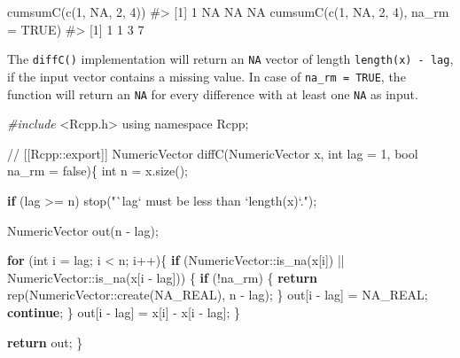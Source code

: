 \documentclass[
]{krantz}
\makeatletter
\newenvironment{Shaded}{\begin{snugshade}}{\end{snugshade}}
\newcommand{\CommentTok}[1]{\textcolor[rgb]{0.56,0.35,0.01}{\textit{#1}}}
\newcommand{\ControlFlowTok}[1]{\textcolor[rgb]{0.13,0.29,0.53}{\textbf{#1}}}
\newcommand{\DataTypeTok}[1]{\textcolor[rgb]{0.13,0.29,0.53}{#1}}
\newcommand{\DecValTok}[1]{\textcolor[rgb]{0.00,0.00,0.81}{#1}}
\newcommand{\ImportTok}[1]{#1}
\newcommand{\KeywordTok}[1]{\textcolor[rgb]{0.13,0.29,0.53}{\textbf{#1}}}
\newcommand{\NormalTok}[1]{#1}
\newcommand{\OtherTok}[1]{\textcolor[rgb]{0.56,0.35,0.01}{#1}}
\newcommand{\PreprocessorTok}[1]{\textcolor[rgb]{0.56,0.35,0.01}{\textit{#1}}}
\newcommand{\StringTok}[1]{\textcolor[rgb]{0.31,0.60,0.02}{#1}}
\newenvironment{kframe}{%
\medskip{}
\setlength{\fboxsep}{.8em}
 \def\at@end@of@kframe{}%
 \ifinner\ifhmode%
  \def\at@end@of@kframe{\end{minipage}}%
  \begin{minipage}{\columnwidth}%
 \fi\fi%
 \def\FrameCommand##1{\hskip\@totalleftmargin \hskip-\fboxsep
 \colorbox{shadecolor}{##1}\hskip-\fboxsep
     \hskip-\linewidth \hskip-\@totalleftmargin \hskip\columnwidth}%
 \MakeFramed {\advance\hsize-\width
   \@totalleftmargin\z@ \linewidth\hsize
   \@setminipage}}%
 {\par\unskip\endMakeFramed%
 \at@end@of@kframe}
\renewenvironment{Shaded}{\begin{kframe}}{\end{kframe}}
\renewcommand{\KeywordTok} [1]{\textcolor[rgb]{0.00,0.44,0.13}{{#1}}}
\renewcommand{\DataTypeTok}[1]{\textcolor[rgb]{0.56,0.13,0.00}{{#1}}}
\renewcommand{\DecValTok}  [1]{\textcolor[rgb]{0.25,0.63,0.44}{{#1}}}
\renewcommand{\StringTok}  [1]{\textcolor[rgb]{0.25,0.44,0.63}{{#1}}}
\renewcommand{\CommentTok} [1]{\textcolor[rgb]{0.38,0.63,0.69}{{#1}}}
\renewcommand{\OtherTok}   [1]{\textcolor[rgb]{0.00,0.44,0.13}{{#1}}}
\renewcommand{\NormalTok}  [1]{{#1}}
\makeatother
\begin{document}
\begin{Shaded}
\begin{Highlighting}[]
\KeywordTok{cumsumC}\NormalTok{(}\KeywordTok{c}\NormalTok{(}\DecValTok{1}\NormalTok{, }\OtherTok{NA}\NormalTok{, }\DecValTok{2}\NormalTok{, }\DecValTok{4}\NormalTok{))}
\CommentTok{#> [1]  1 NA NA NA}
\KeywordTok{cumsumC}\NormalTok{(}\KeywordTok{c}\NormalTok{(}\DecValTok{1}\NormalTok{, }\OtherTok{NA}\NormalTok{, }\DecValTok{2}\NormalTok{, }\DecValTok{4}\NormalTok{), }\DataTypeTok{na_rm =} \OtherTok{TRUE}\NormalTok{)}
\CommentTok{#> [1] 1 1 3 7}
\end{Highlighting}
\end{Shaded}

The \texttt{diffC()} implementation will return an \texttt{NA} vector of length \texttt{length(x)\ -\ lag}, if the input vector contains a missing value. In case of \texttt{na\_rm\ =\ TRUE}, the function will return an \texttt{NA} for every difference with at least one \texttt{NA} as input.

\begin{Shaded}
\begin{Highlighting}[]
\PreprocessorTok{#include }\ImportTok{<Rcpp.h>}
\KeywordTok{using} \KeywordTok{namespace}\NormalTok{ Rcpp;}

\CommentTok{// [[Rcpp::export]]}
\NormalTok{NumericVector diffC(NumericVector x, }\DataTypeTok{int}\NormalTok{ lag = }\DecValTok{1}\NormalTok{,}
                    \DataTypeTok{bool}\NormalTok{ na_rm = }\KeywordTok{false}\NormalTok{)\{}
  \DataTypeTok{int}\NormalTok{ n = x.size();}
  
  \ControlFlowTok{if}\NormalTok{ (lag >= n) stop(}\StringTok{"`lag` must be less than `length(x)`."}\NormalTok{);}
  
\NormalTok{  NumericVector out(n - lag);}
  
  \ControlFlowTok{for}\NormalTok{ (}\DataTypeTok{int}\NormalTok{ i = lag; i < n; i++)\{}
    \ControlFlowTok{if}\NormalTok{ (NumericVector::is_na(x[i]) ||}
\NormalTok{        NumericVector::is_na(x[i - lag])) \{}
      \ControlFlowTok{if}\NormalTok{ (!na_rm) \{}
        \ControlFlowTok{return}\NormalTok{ rep(NumericVector::create(NA_REAL), n - lag);}
\NormalTok{      \}}
\NormalTok{      out[i - lag] = NA_REAL;}
      \ControlFlowTok{continue}\NormalTok{;}
\NormalTok{    \}}
\NormalTok{    out[i - lag] = x[i] - x[i - lag];}
\NormalTok{  \}}
  
  \ControlFlowTok{return}\NormalTok{ out;}
\NormalTok{\}}
\end{Highlighting}
\end{Shaded}
\end{document}
